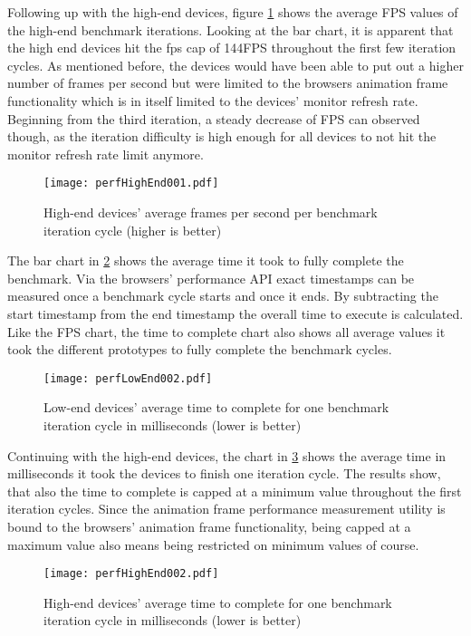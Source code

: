Following up with the high-end devices, figure \ref{fig:perfHighEnd001} shows the average FPS values of the high-end benchmark iterations. Looking at the bar chart, it is apparent that the high end devices hit the fps cap of 144FPS throughout the first few iteration cycles. As mentioned before, the devices would have been able to put out a higher number of frames per second but were limited to the browsers animation frame functionality which is in itself limited to the devices' monitor refresh rate. Beginning from the third iteration, a steady decrease of FPS can observed though, as the iteration difficulty is high enough for all devices to not hit the monitor refresh rate limit anymore.

\begin{figure}
\centering
\texttt{[image: perfHighEnd001.pdf]}
\caption{High-end devices' average frames per second per benchmark iteration cycle (higher is better)}
\label{fig:perfHighEnd001}
\end{figure}

The bar chart in \ref{fig:perfLowEnd002} shows the average time it took to fully complete the benchmark. Via the browsers' performance API exact timestamps can be measured once a benchmark cycle starts and once it ends. By subtracting the start timestamp from the end timestamp the overall time to execute is calculated. Like the FPS chart, the time to complete chart also shows all average values it took the different prototypes to fully complete the benchmark cycles.

\begin{figure}
\centering
\texttt{[image: perfLowEnd002.pdf]}
\caption{Low-end devices' average time to complete for one benchmark iteration cycle in milliseconds (lower is better)}
\label{fig:perfLowEnd002}
\end{figure}

Continuing with the high-end devices, the chart in \ref{fig:perfHighEnd002} shows the average time in milliseconds it took the devices to finish one iteration cycle. The results show, that also the time to complete is capped at a minimum value throughout the first iteration cycles. Since the animation frame performance measurement utility is bound to the browsers' animation frame functionality, being capped at a maximum value also means being restricted on minimum values of course.

\begin{figure}
\centering
\texttt{[image: perfHighEnd002.pdf]}
\caption{High-end devices' average time to complete for one benchmark iteration cycle in milliseconds (lower is better)}
\label{fig:perfHighEnd002}
\end{figure}

